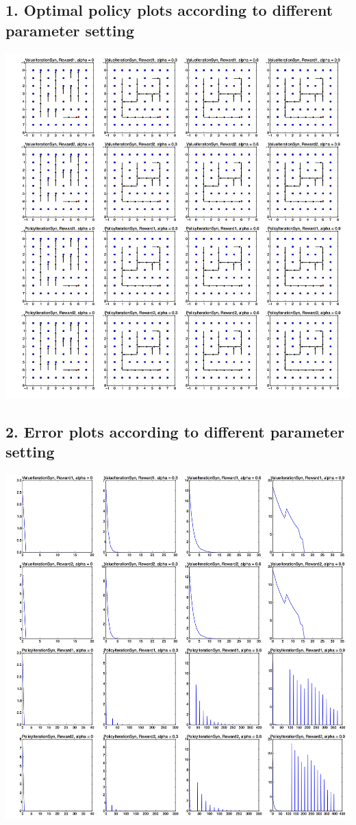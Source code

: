 \documentclass[12pt,a4paper,titlepage]{article}
\begin{document}
\subsection*{1. Optimal policy plots according to different parameter setting}
\includegraphics[scale=0.5]{PolicyPlot.jpg}
\newpage
\subsection*{2. Error plots according to different parameter setting}
\includegraphics[scale=0.5]{ErrorPlot.jpg}
\newpage
\end{document}
